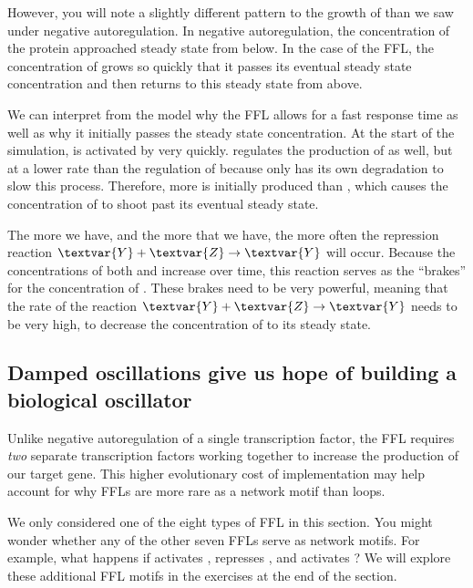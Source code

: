 However, you will note a slightly different pattern to the growth of  than we saw under negative autoregulation. In negative autoregulation, the concentration of the protein approached steady state from below. In the case of the FFL, the concentration of  grows so quickly that it passes its eventual steady state concentration and then returns to this steady state from above.

We can interpret from the model why the FFL allows for a fast response time as well as why it initially passes the steady state concentration. At the start of the simulation,  is activated by  very quickly.  regulates the production of  as well, but at a lower rate than the regulation of  because  only has its own degradation to slow this process. Therefore, more  is initially produced than , which causes the concentration of  to shoot past its eventual steady state.

The more  we have, and the more  that we have, the more often the repression reaction $\textvar{Y} + \textvar{Z} \rightarrow \textvar{Y}$ will occur. Because the concentrations of both  and  increase over time, this reaction serves as the ``brakes'' for the concentration of . These brakes need to be very powerful, meaning that the rate of the reaction $\textvar{Y} + \textvar{Z} \rightarrow \textvar{Y}$ needs to be very high, to decrease the concentration of  to its steady state.

\FloatBarrier
{}
\subsection{Damped oscillations give us hope of building a biological oscillator}

Unlike negative autoregulation of a single transcription factor, the FFL requires \textit{two} separate transcription factors working together to increase the production of our target gene. This higher evolutionary cost of implementation may help account for why FFLs are more rare as a network motif than loops.

We only considered one of the eight types of FFL in this section. You might wonder whether any of the other seven FFLs serve as network motifs.  For example, what happens if  activates ,  represses , and  activates ? We will explore these additional FFL motifs in the exercises at the end of the section.

